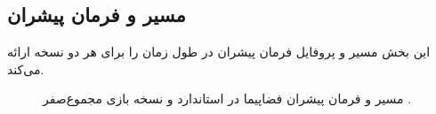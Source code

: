\subsection{مسیر و فرمان پیشران}
این بخش مسیر و پروفایل فرمان پیشران در طول زمان را برای هر دو نسخه  ارائه می‌کند.
\begin{figure}[H]
	\centering
	\caption{مسیر و فرمان پیشران فضاپیما در  استاندارد و نسخه بازی مجموع‌صفر .}
\end{figure}

